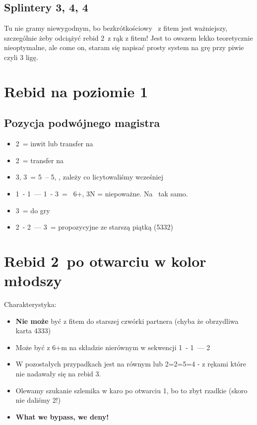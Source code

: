 \documentclass[12pt, a4paper]{article}
\newcommand*\link[1]{\hspace*{0em plus 1fill}\makebox{#1}}
\newcommand{\imp}{\color{BurntOrange}\link{\textbf{\large!}}\color{black}}
\begin{document}
\subsection*{Splintery 3\spades, 4\clubs, 4\diams}
Tu nie gramy niewygodnym, bo bezkrótkościowy \gf\ z fitem jest ważniejszy, szczególnie żeby odciążyć rebid 2\nt\ z rąk z fitem!
Jest to owszem lekko teoretycznie nieoptymalne, ale come on, staram się napisać prosty system na grę przy piwie czyli 3 ligę.



\pagebreak
\section{Rebid na poziomie 1}
\subsection*{Pozycja podwójnego magistra}
\begin{itemize}
    \item 2\clubs\ = inwit lub transfer na \diams\
    \item 2\nt\ = transfer na \clubs\
    \item 3\clubs, 3\diams\ = 5\minor\ -- 5\major, \gf, zależy co licytowaliśmy wcześniej
    \item 1\clubs\ - 1\spades\ --- 1\nt\ - 3\spades\ = \gf\ 6+\spades, 3N = niepoważne. Na \hearts\ tak samo.
    \item 3\nt\ = do gry
    \item 2\clubs\ - 2\diams\ --- 3\nt\ = propozycyjne ze starszą piątką (5332) \imp
\end{itemize}



\pagebreak
\section{Rebid 2\ntx\ po otwarciu w kolor młodszy}
Charakterystyka:
\begin{itemize}
    \item \textbf{Nie może} być z fitem do starszej czwórki partnera (chyba że obrzydliwa karta 4333)
    \item Może być z 6+m na składzie nierównym w sekwencji 1\diams\ - 1\hearts\ --- 2\nt \imp
    \item W pozostałych przypadkach jest na równym lub 2=2=5=4 - z rękami które nie nadawały się na rebid 3\clubs.
    \item Olewamy szukanie szlemika w karo po otwarciu 1\clubs, bo to zbyt rzadkie (skoro nie daliśmy 2\nt!)
    \item \textbf{What we bypass, we deny!}
\end{itemize}
\end{document}
